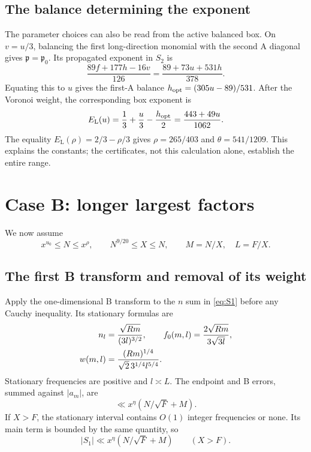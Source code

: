 \documentclass[11pt,a4paper]{article}
\numberwithin{equation}{section}
\theoremstyle{remark}
\begin{document}
\subsection{The balance determining the exponent}
The parameter choices can also be read from the active balanced box.
On $v=u/3$, balancing the first long-direction monomial with the second
A diagonal gives $\mathfrak p=\mathfrak p_0$. Its propagated exponent
in $S_2$ is
\[
 \frac{89f+177h-16v}{126}
 =\frac{89+73u+531h}{378}.
\]
Equating this to $u$ gives the first-A balance
$h_{\rm opt}=(305u-89)/531$. After the Voronoi weight, the corresponding
box exponent is
\[
 E_{\mathrm L}(u)=\frac13+\frac u3-\frac{h_{\rm opt}}2
                =\frac{443+49u}{1062}.
\]
The equality $E_{\mathrm L}(\rho)=2/3-\rho/3$ gives
$\rho=265/403$ and $\theta=541/1209$. This explains the constants;
the certificates, not this calculation alone, establish the entire range.

\section{Case B: longer largest factors}
\label{sec:caseB}
We now assume
\begin{equation}\label{eq:caseB-range}
 x^{u_0}\le N\le x^\rho,\qquad N^{9/20}\le X\le N,
 \qquad M=N/X,\quad L=F/X.
\end{equation}

\subsection{The first B transform and removal of its weight}
Apply the one-dimensional B transform to the $n$ sum in \eqref{eq:S1}
before any Cauchy inequality. Its stationary formulas are
\begin{align}
 n_l&=\frac{\sqrt{Rm}}{(3l)^{3/2}},\qquad
 f_0(m,l)=\frac{2\sqrt{Rm}}{3\sqrt{3l}},\notag\\
 w(m,l)&=\frac{(Rm)^{1/4}}{\sqrt2\,3^{1/4}l^{5/4}}.
              \label{eq:caseB-firstB}
\end{align}
Stationary frequencies are positive and $l\asymp L$. The endpoint and B
errors, summed against $|a_m|$, are
\begin{equation}\label{eq:caseB-first-error}
 \ll x^\eta(N/\sqrt F+M).
\end{equation}
If $X>F$, the stationary interval contains $O(1)$ integer frequencies or
none. Its main term is bounded by the same quantity, so
\begin{equation}\label{eq:caseB-short-first}
 |S_1|\ll x^\eta(N/\sqrt F+M)\qquad (X>F).
\end{equation}
\end{document}
